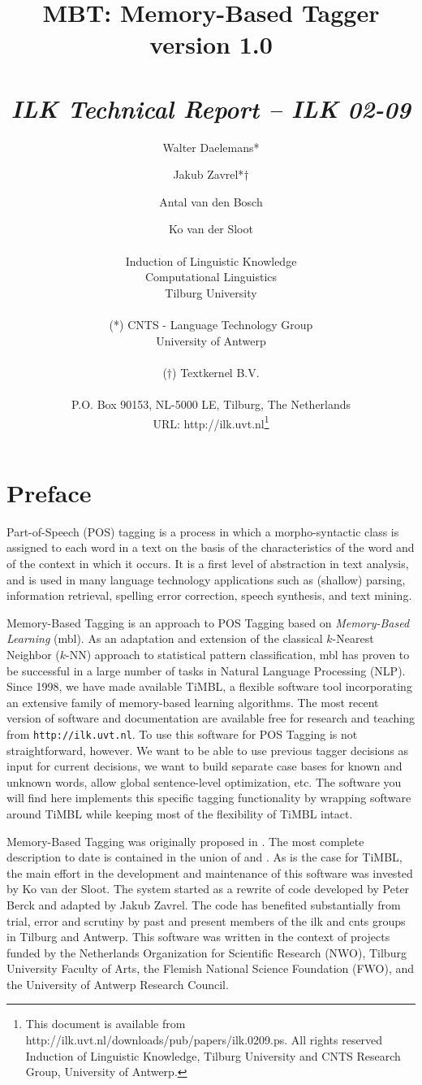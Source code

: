 \documentclass{report}
\author{Walter Daelemans* \and Jakub Zavrel*$\dagger$ \and
	Antal van den Bosch \and Ko van der Sloot\\ \ \\
	Induction of Linguistic Knowledge\\
	Computational Linguistics\\ 
        Tilburg University \\ \\
	(*) CNTS - Language Technology Group\\
	University of Antwerp\\ \\
	($\dagger$) Textkernel B.V.\\ \\
        P.O. Box 90153, NL-5000 LE, Tilburg, The Netherlands \\ 
        URL: http://ilk.uvt.nl\thanks{This document is available from
	http://ilk.uvt.nl/downloads/pub/papers/ilk.0209.ps. All rights reserved
	Induction of Linguistic Knowledge, Tilburg University and 
        CNTS Research Group, University of Antwerp.}}
\title{{\huge MBT: Memory-Based Tagger} \\ \vspace*{0.5cm}
{\bf version 1.0} \\ \vspace*{0.5cm}{\huge Reference Guide}\\
\vspace*{1cm} {\it ILK Technical Report -- ILK 02-09}}
\begin{document}

\maketitle

\tableofcontents

\chapter*{Preface}

Part-of-Speech (POS) tagging is a process in which a morpho-syntactic
class is assigned to each word in a text on the basis of the
characteristics of the word and of the context in which it occurs. It
is a first level of abstraction in text analysis, and is used in many
language technology applications such as (shallow) parsing,
information retrieval, spelling error correction, speech synthesis, and
text mining. 

Memory-Based Tagging is an approach to POS Tagging based on {\em
Memory-Based Learning} ({\sc mbl}).  As an adaptation and extension of
the classical $k$-Nearest Neighbor ($k$-NN) approach to statistical
pattern classification, {\sc mbl} has proven to be successful in a
large number of tasks in Natural Language Processing (NLP). Since
1998, we have made available TiMBL, a flexible software tool
incorporating an extensive family of memory-based learning
algorithms. The most recent version of software and documentation are
available free for research and teaching from {\tt http://ilk.uvt.nl}.
To use this software for POS Tagging is not straightforward,
however. We want to be able to use previous tagger decisions as input
for current decisions, we want to build separate case bases for known
and unknown words, allow global sentence-level optimization, etc.  The
software you will find here implements this specific tagging
functionality by wrapping software around TiMBL while keeping
most of the flexibility of TiMBL intact. 

Memory-Based Tagging was originally proposed in
\cite{Daelemans95}. The most complete description to date is contained
in the union of \cite{Daelemans+96} and \cite{Zavrel+99}.  As is the
case for TiMBL, the main effort in the development and
maintenance of this software was invested by Ko van der Sloot. The
system started as a rewrite of code developed by Peter Berck and
adapted by Jakub Zavrel. The code has benefited substantially from
trial, error and scrutiny by past and present members of the {\sc ilk}
and {\sc cnts} groups in Tilburg and Antwerp. This software was
written in the context of projects funded by the Netherlands
Organization for Scientific Research (NWO), Tilburg University Faculty
of Arts, the Flemish National Science Foundation (FWO), and the
University of Antwerp Research Council.
\end{document}
